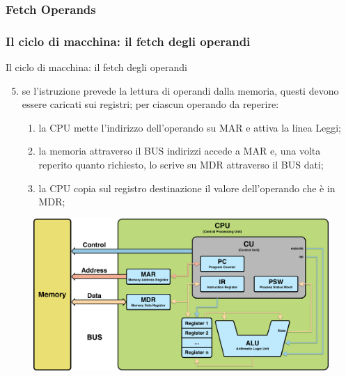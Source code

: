 \subsubsection[Fetch Operands]{Fetch Operands}
\begin{frame}
	\frametitle{Il ciclo di macchina: il {\color{CpuBlue}\textbf{fetch degli operandi}}}
	
	\begin{block}{Il ciclo di macchina: il fetch degli operandi}
		\begin{enumerate}
			\setcounter{enumi}{4}
			\item se l'istruzione prevede la lettura di operandi dalla memoria, questi devono essere caricati sui registri; per ciascun operando da reperire: 
				\begin{enumerate}
					\item la CPU mette l'indirizzo dell'operando su MAR e attiva la linea Leggi;
					\item la memoria attraverso il BUS indirizzi accede a MAR e, una volta reperito quanto richiesto, lo scrive su MDR attraverso il BUS dati;
					\item la CPU copia sul registro destinazione il valore dell'operando che è in MDR;
				\end{enumerate}
			
		\end{enumerate}
	
	\end{block}
	
	\begin{figure}[!htbp] 
		\centering
		\includegraphics[width=0.51\linewidth]{images/4_cpu/architecture_cpu_complex.pdf}
		\label{fig:cpu_complex}
	\end{figure}
	
\end{frame}


